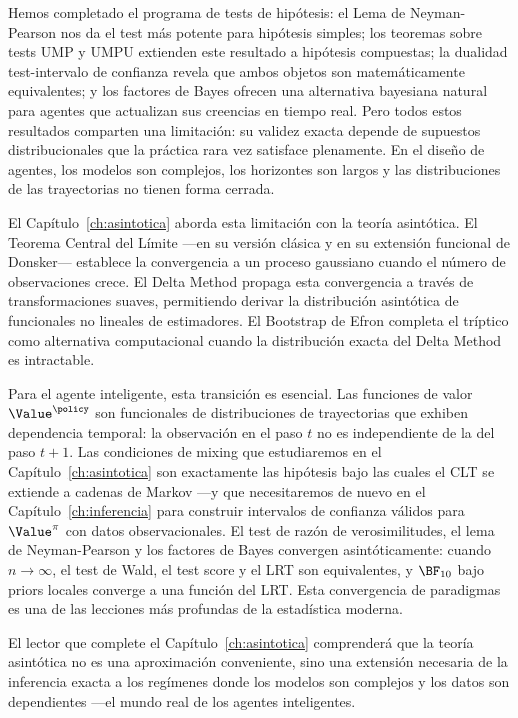 Hemos completado el programa de tests de hipótesis: el Lema de Neyman-Pearson
nos da el test más potente para hipótesis simples; los teoremas sobre tests UMP
y UMPU extienden este resultado a hipótesis compuestas; la dualidad test-intervalo
de confianza revela que ambos objetos son matemáticamente equivalentes; y los
factores de Bayes ofrecen una alternativa bayesiana natural para agentes que
actualizan sus creencias en tiempo real. Pero todos estos resultados comparten
una limitación: su validez exacta depende de supuestos distribucionales que la
práctica rara vez satisface plenamente. En el diseño de agentes, los modelos son
complejos, los horizontes son largos y las distribuciones de las trayectorias no
tienen forma cerrada.

El Capítulo~\ref{ch:asintotica} aborda esta limitación con la teoría asintótica.
El Teorema Central del Límite ---en su versión clásica y en su extensión funcional
de Donsker--- establece la convergencia a un proceso gaussiano cuando el número de
observaciones crece. El Delta Method propaga esta convergencia a través de
transformaciones suaves, permitiendo derivar la distribución asintótica de
funcionales no lineales de estimadores. El Bootstrap de Efron completa el tríptico
como alternativa computacional cuando la distribución exacta del Delta Method es
intractable.

Para el agente inteligente, esta transición es esencial. Las funciones de valor
$\Value^\policy$ son funcionales de distribuciones de trayectorias que exhiben
dependencia temporal: la observación en el paso $t$ no es independiente de la del
paso $t+1$. Las condiciones de mixing que estudiaremos en el
Capítulo~\ref{ch:asintotica} son exactamente las hipótesis bajo las cuales el CLT
se extiende a cadenas de Markov ---y que necesitaremos de nuevo en el
Capítulo~\ref{ch:inferencia} para construir intervalos de confianza válidos para
$\Value^\pi$ con datos observacionales. El test de razón de verosimilitudes, el
lema de Neyman-Pearson y los factores de Bayes convergen asintóticamente: cuando
$n \to \infty$, el test de Wald, el test score y el LRT son equivalentes, y
$\BF_{10}$ bajo priors locales converge a una función del LRT. Esta convergencia
de paradigmas es una de las lecciones más profundas de la estadística moderna.

El lector que complete el Capítulo~\ref{ch:asintotica} comprenderá que la teoría
asintótica no es una aproximación conveniente, sino una extensión necesaria de la
inferencia exacta a los regímenes donde los modelos son complejos y los datos son
dependientes ---el mundo real de los agentes inteligentes.

